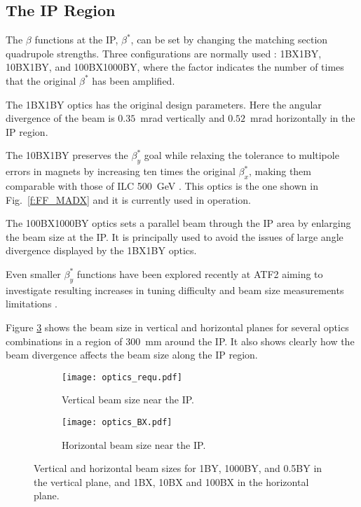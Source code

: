 \subsection{The IP Region}\label{s:opticsIP}
The $\beta$ functions at the IP, $\beta^*$, can be set by changing the matching section quadrupole strengths. Three configurations are normally used : 1BX1BY, 10BX1BY, and 100BX1000BY, where the factor indicates the number of times that the original $\beta^*$ has been amplified.\par
The 1BX1BY optics has the original design parameters. Here the angular divergence of the beam is $0.35$~mrad vertically and $0.52$~mrad horizontally in the IP region. \par
The 10BX1BY preserves the $\beta_y^*$ goal while relaxing the tolerance to multipole errors in magnets by increasing ten times the original $\beta_x^*$, making them comparable with those of ILC 500~GeV \cite{PhysRevSTAB.17.023501}. This optics is the one shown in Fig.~\ref{f:FF_MADX} and it is currently used in operation.\par
The 100BX1000BY optics sets a parallel beam through the IP area by enlarging the beam size at the IP. It is principally used to avoid the issues of large angle divergence displayed by the 1BX1BY optics.\par
Even smaller $\beta_y^*$ functions have been explored recently at ATF2 aiming to investigate resulting increases in tuning difficulty and beam size measurements limitations \cite{PateckiLowBeta}.\par
Figure \ref{f:BXYoptics} shows the beam size in vertical and horizontal planes for several optics combinations in a region of 300~mm around the IP. It also shows clearly how the beam divergence affects the beam size along the IP region.\par 
\begin{figure}[h]
 \begin{center}
 \hspace*{-1cm}
 \begin{subfigure}[b]{0.45\textwidth}
  \texttt{[image: optics\_requ.pdf]}\caption{Vertical beam size near the IP.}\label{f:opticsBY}
 \end{subfigure}\hspace{0.5cm}
\begin{subfigure}[b]{0.45\textwidth}
  \texttt{[image: optics\_BX.pdf]}\caption{Horizontal beam size near the IP.}\label{f:opticsBX}
 \end{subfigure}
  \caption{Vertical and horizontal beam sizes for 1BY, 1000BY, and 0.5BY in the vertical plane, and 1BX, 10BX and 100BX in the horizontal plane.}\label{f:BXYoptics}
 \end{center}
\end{figure}
